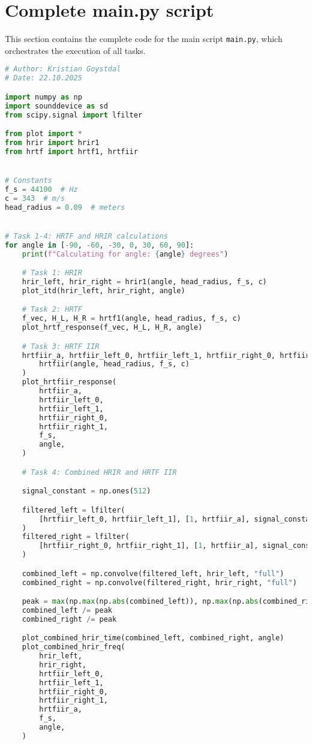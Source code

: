 \section{Complete main.py script}
This section contains the complete code for the main script \texttt{main.py}, which orchestrates the execution of all tasks.

\begin{lstlisting}[language=Python, caption={main.py}, label={lst:main.py}]
# Author: Kristian Goystdal
# Date: 22.10.2025

import numpy as np
import sounddevice as sd
from scipy.signal import lfilter

from plot import *
from hrir import hrir1
from hrtf import hrtf1, hrtfiir


# Constants
f_s = 44100  # Hz
c = 343  # m/s
head_radius = 0.09  # meters


# Task 1-4: HRTF and HRIR calculations
for angle in [-90, -60, -30, 0, 30, 60, 90]:
    print(f"Calculating for angle: {angle} degrees")

    # Task 1: HRIR
    hrir_left, hrir_right = hrir1(angle, head_radius, f_s, c)
    plot_itd(hrir_left, hrir_right, angle)

    # Task 2: HRTF
    f_vec, H_L, H_R = hrtf1(angle, head_radius, f_s, c)
    plot_hrtf_response(f_vec, H_L, H_R, angle)

    # Task 3: HRTF IIR
    hrtfiir_a, hrtfiir_left_0, hrtfiir_left_1, hrtfiir_right_0, hrtfiir_right_1 = (
        hrtfiir(angle, head_radius, f_s, c)
    )
    plot_hrtfiir_response(
        hrtfiir_a,
        hrtfiir_left_0,
        hrtfiir_left_1,
        hrtfiir_right_0,
        hrtfiir_right_1,
        f_s,
        angle,
    )

    # Task 4: Combined HRIR and HRTF IIR

    signal_constant = np.ones(512)

    filtered_left = lfilter(
        [hrtfiir_left_0, hrtfiir_left_1], [1, hrtfiir_a], signal_constant
    )
    filtered_right = lfilter(
        [hrtfiir_right_0, hrtfiir_right_1], [1, hrtfiir_a], signal_constant
    )

    combined_left = np.convolve(filtered_left, hrir_left, "full")
    combined_right = np.convolve(filtered_right, hrir_right, "full")

    peak = max(np.max(np.abs(combined_left)), np.max(np.abs(combined_right)))
    combined_left /= peak
    combined_right /= peak

    plot_combined_hrir_time(combined_left, combined_right, angle)
    plot_combined_hrir_freq(
        hrir_left,
        hrir_right,
        hrtfiir_left_0,
        hrtfiir_left_1,
        hrtfiir_right_0,
        hrtfiir_right_1,
        hrtfiir_a,
        f_s,
        angle,
    )



\end{lstlisting}

